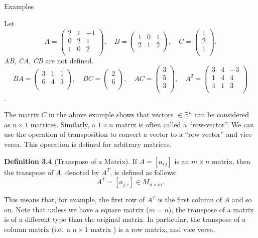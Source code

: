 \documentclass[
  letterpaper,
  DIV=11,
  numbers=noendperiod]{scrartcl}
\makeatletter
\let\oldsubparagraph\subparagraph
\renewcommand{\subparagraph}{
    \@ifstar
      \xxxSubParagraphStar
      \xxxSubParagraphNoStar
  }
\newcommand{\xxxSubParagraphStar}[1]{\oldsubparagraph*{#1}\mbox{}}
\newcommand{\xxxSubParagraphNoStar}[1]{\oldsubparagraph{#1}\mbox{}}
\theoremstyle{remark}
\makeatother
\begin{document}
\subparagraph{Examples}\label{examples}

Let \[A= \begin{pmatrix}
 2  & 1  & {-1}  \\
 0  & 2  & 1  \\
 1  & 0  & 2  \\
\end{pmatrix} ,\quad B= \begin{pmatrix}
 1  & 0 & 1  \\
 2  & 1 & 2 \\
\end{pmatrix} ,\quad C= \begin{pmatrix}
 1  \\
 2  \\
 1  \\
\end{pmatrix} .\] \emph{AB}, \emph{CA}, \emph{CB} are not defined.
\[BA= \begin{pmatrix}
 3  & 1 & 1 \\
 6  & 4 & 3 \\
\end{pmatrix} ,\quad BC= \begin{pmatrix}
 2  \\
 6  \\
\end{pmatrix} ,\quad 
AC= \begin{pmatrix}
 3  \\
 5  \\
 3  \\
\end{pmatrix} ,\quad 
A^2= \begin{pmatrix}
 3  & 4  & {-3}  \\
 1  & 4  & 4  \\
 4  & 1  & 3  \\
\end{pmatrix}\].

The matrix \(C\) in the above example shows that vectors
\(\in \mathbb{R}^{n}\) can be considered as \(n\times1\) matrices.
Similarly, a \(1\times n\) matrix is often called a ``row-vector''. We
can use the operation of transposition to convert a vector to a ``row
vector'' and vice versa. This operation is defined for arbitrary
matrices.

\textbf{Definition 3.4} (Transpose of a Matrix). If \(A=[a_{i\,j} ]\) is
an \(m\times n\) matrix, then the transpose of \(A\), denoted by
\(A^T\), is defined as follows: \[A^T=[a_{j,i}]  \in M_{n\times m}  .\]

This means that, for example, the first row of \(A^T\) is the first
column of \(A\) and so on. Note that unless we have a square matrix
(\(m=n\)), the transpose of a matrix is of a different type than the
original matrix. In particular, the transpose of a column matrix (i.e.~a
\(n\times 1\) matrix ) is a row matrix, and vice versa.
\end{document}

